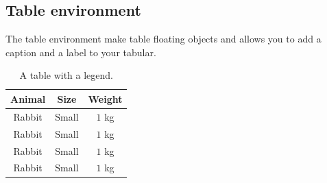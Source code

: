 \documentclass[10pt,a4paper]{article}
\begin{document}
\subsection{Table environment}

The table environment make table floating objects and allows you to add a caption and a label to your tabular.

\begin{table} %
    \begin{center}
        \begin{tabular}{ccc}
            \toprule
            \textbf{Animal} & \textbf{Size} & \textbf{Weight} \\
            \midrule
            Rabbit          & Small         & $1$ kg          \\
            Rabbit          & Small         & $1$ kg          \\
            Rabbit          & Small         & $1$ kg          \\
            Rabbit          & Small         & $1$ kg          \\
            \bottomrule
        \end{tabular}
    \end{center}
    \caption{A table with a legend.}
    \label{tab:useless_table}
\end{table}
\end{document}
